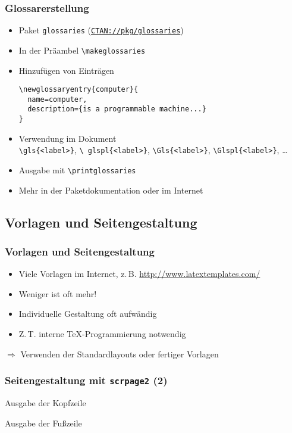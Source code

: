 \begin{frame}[fragile]
  \frametitle{Glossarerstellung}
  \begin{itemize}
  \item Paket \texttt{glossaries}
    (\href{http://ctan.org/pkg/glossaries}{\texttt{CTAN://pkg/glossaries}})
  \item In der Präambel \texttt{\textbackslash makeglossaries}
  \item Hinzufügen von Einträgen
\begin{lstlisting}[language={[LaTeX]TeX}]
\newglossaryentry{computer}{
  name=computer,
  description={is a programmable machine...}
}
\end{lstlisting}
  \item Verwendung im Dokument\\
    \texttt{\textbackslash gls\{<label>\}}, \texttt{\textbackslash
      glspl\{<label>\}}, \texttt{\textbackslash Gls\{<label>\}},
    \texttt{\textbackslash Glspl\{<label>\}}, \dots
  \item Ausgabe mit \texttt{\textbackslash printglossaries}
  \item Mehr in der Paketdokumentation oder im Internet
  \end{itemize}
\end{frame}

\subsection{Vorlagen und Seitengestaltung}
\begin{frame}
  \frametitle{Vorlagen und Seitengestaltung}
  \begin{itemize}
  \item Viele Vorlagen im Internet,
    z.\,B. \href{http://www.latextemplates.com/}{http://www.latextemplates.com/}
  \item Weniger ist oft mehr!
  \item Individuelle Gestaltung oft aufwändig
  \item Z.\,T. interne \TeX-Programmierung notwendig
  \end{itemize}
  $\Rightarrow$ Verwenden der Standardlayouts oder fertiger Vorlagen
\end{frame}

\begin{frame}[fragile]
  \frametitle{Seitengestaltung mit \texttt{scrpage2}}
  TeX}]{examples/documents/scrheadings.tex}
\end{frame}

\begin{frame}
  \frametitle{Seitengestaltung mit \texttt{scrpage2} (2)}
  Ausgabe der Kopfzeile

  Ausgabe der Fußzeile
\end{frame}
